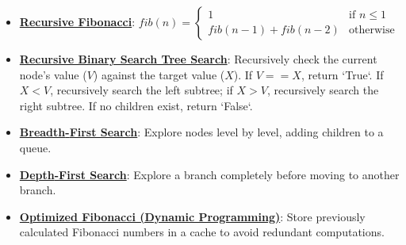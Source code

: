\documentclass{article}%
\begin{document}
\begin{itemize}[leftmargin=*]%
\item \href{https://www.math.purdue.edu/~yipn/351/14L1-DepthFS.pdf#page=6}{\textbf{Recursive Fibonacci}}: $fib(n) = \begin{cases} 1 & \text{if } n \le 1 \\ fib(n-1) + fib(n-2) & \text{otherwise} \end{cases}$%
\item \href{https://www.math.purdue.edu/~yipn/351/14L1-DepthFS.pdf#page=10}{\textbf{Recursive Binary Search Tree Search}}: Recursively check the current node's value ($V$) against the target value ($X$). If $V == X$, return `True`. If $X < V$, recursively search the left subtree; if $X > V$, recursively search the right subtree. If no children exist, return `False`.%
\item \href{https://www.math.purdue.edu/~yipn/351/14L1-DepthFS.pdf#page=8}{\textbf{Breadth{-}First Search}}: Explore nodes level by level, adding children to a queue.%
\item \href{https://www.math.purdue.edu/~yipn/351/14L1-DepthFS.pdf#page=8}{\textbf{Depth{-}First Search}}: Explore a branch completely before moving to another branch.%
\item \href{https://www.math.purdue.edu/~yipn/351/14L1-DepthFS.pdf#page=23}{\textbf{Optimized Fibonacci (Dynamic Programming)}}: Store previously calculated Fibonacci numbers in a cache to avoid redundant computations.%
\end{itemize}%
\end{document}
